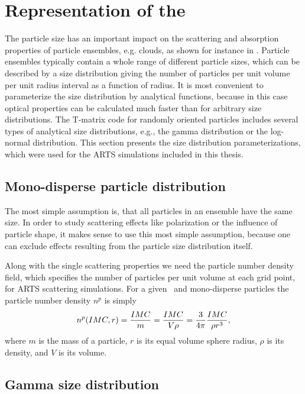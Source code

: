 \section[Particle size distributions]
{Representation of the }
\label{sec:clouds:size_distr}

The particle size has an important impact on the scattering and
absorption properties of particle ensembles, e.g. clouds, as shown for instance
in \citep{emde04:_doit_jgr}.  Particle ensembles typically contain a whole range
of different particle sizes, which can be described by a size
distribution giving the number of particles per unit volume per unit
radius interval as a function of radius.  It is most convenient to
parameterize the size distribution by analytical functions, because in
this case optical properties can be calculated much faster than for
arbitrary size distributions. The T-matrix code for randomly oriented
particles includes several types of analytical size distributions,
e.g., the gamma distribution or the log-normal distribution.  This
section presents the size distribution parameterizations, which were
used for the ARTS simulations included in this thesis.

\subsection{Mono-disperse particle distribution}

The most simple assumption is, that all particles in an ensemble have
the same size.  In order to study scattering effects like polarization
or the influence of particle shape, it makes sense to use this most
simple assumption, because one can exclude effects resulting from the
particle size distribution itself.  

Along with the single scattering properties we need the particle
number density field, which specifies the number of particles per
unit volume at each grid point, for ARTS scattering simulations.  For
a given \imc\ and mono-disperse particles the particle number density
$n^p$ is simply
\begin{equation}
\label{eq:pnd_mono}
  n^p (IMC, r) =\frac{IMC}{m} = \frac{IMC}{V\rho}
    =\frac{3}{4\pi}\frac{IMC}{\rho r^3},  
\end{equation}
where $m$ is the mass of a particle, $r$ is its equal volume sphere
radius, $\rho$ is its density, and $V$ is its volume.
     
\subsection{Gamma size distribution}
\label{sec:clouds:gamma_distr}

